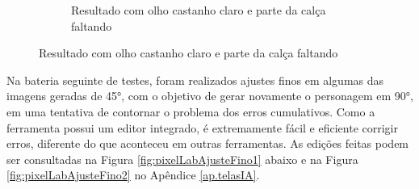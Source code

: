 \begin{figure}[htbp]
\begin{subfigure}{0.45\linewidth}
        \caption{\small Resultado com olho castanho claro e parte da calça faltando}
        \label{fig:pixelLabRotComparaCorB}
    \end{subfigure}

\end{figure}

Na bateria seguinte de testes, foram realizados ajustes finos em algumas das imagens geradas de 45°, com o objetivo de gerar novamente o personagem em 90°, em uma tentativa de contornar o problema dos erros cumulativos. Como a ferramenta possui um editor integrado, é extremamente fácil e eficiente corrigir erros, diferente do que aconteceu em outras ferramentas. As edições feitas podem ser consultadas na Figura \ref{fig:pixelLabAjusteFino1} abaixo e na Figura \ref{fig:pixelLabAjusteFino2} no Apêndice \ref{ap.telasIA}.

